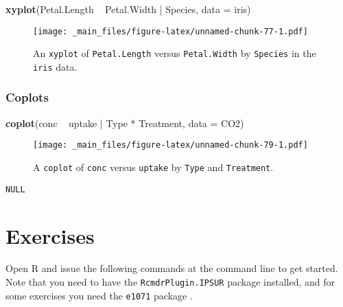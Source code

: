 \documentclass[]{book}
\newenvironment{Shaded}{\begin{snugshade}}{\end{snugshade}}
\newcommand{\KeywordTok}[1]{\textcolor[rgb]{0.13,0.29,0.53}{\textbf{{#1}}}}
\newcommand{\DataTypeTok}[1]{\textcolor[rgb]{0.13,0.29,0.53}{{#1}}}
\newcommand{\StringTok}[1]{\textcolor[rgb]{0.31,0.60,0.02}{{#1}}}
\newcommand{\NormalTok}[1]{{#1}}
\numberwithin{equation}{chapter}
\numberwithin{figure}{chapter}
\theoremstyle{plain}
\theoremstyle{definition}
\theoremstyle{remark}
\theoremstyle{definition}
\theoremstyle{definition}
\theoremstyle{remark}
\begin{document}
\begin{Shaded}
\begin{Highlighting}[]
\KeywordTok{xyplot}\NormalTok{(Petal.Length ~}\StringTok{ }\NormalTok{Petal.Width |}\StringTok{ }\NormalTok{Species, }\DataTypeTok{data =} \NormalTok{iris)}
\end{Highlighting}
\end{Shaded}

\begin{figure}[htbp]
\centering
\texttt{[image: \_main\_files/figure-latex/unnamed-chunk-77-1.pdf]}
\caption{\label{fig:unnamed-chunk-77}\small An \texttt{xyplot} of \texttt{Petal.Length}
versus \texttt{Petal.Width} by \texttt{Species} in the \texttt{iris}
data.}
\end{figure}





\subsubsection{Coplots}\label{coplots}

\begin{Shaded}
\begin{Highlighting}[]
\KeywordTok{coplot}\NormalTok{(conc ~}\StringTok{ }\NormalTok{uptake |}\StringTok{ }\NormalTok{Type *}\StringTok{ }\NormalTok{Treatment, }\DataTypeTok{data =} \NormalTok{CO2)}
\end{Highlighting}
\end{Shaded}

\begin{figure}[htbp]
\centering
\texttt{[image: \_main\_files/figure-latex/unnamed-chunk-79-1.pdf]}
\caption{\label{fig:unnamed-chunk-79}\small A \texttt{coplot} of \texttt{conc} versus
\texttt{uptake} by \texttt{Type} and \texttt{Treatment}.}
\end{figure}

\begin{verbatim}
NULL
\end{verbatim}




\section{Exercises}\label{exercises-1}

Open R and issue the following commands at the command line to get
started. Note that you need to have the \texttt{RcmdrPlugin.IPSUR}
package \autocite{RcmdrPlugin.IPSUR} installed, and for some exercises
you need the \texttt{e1071} package \autocite{e1071}.
\end{document}
